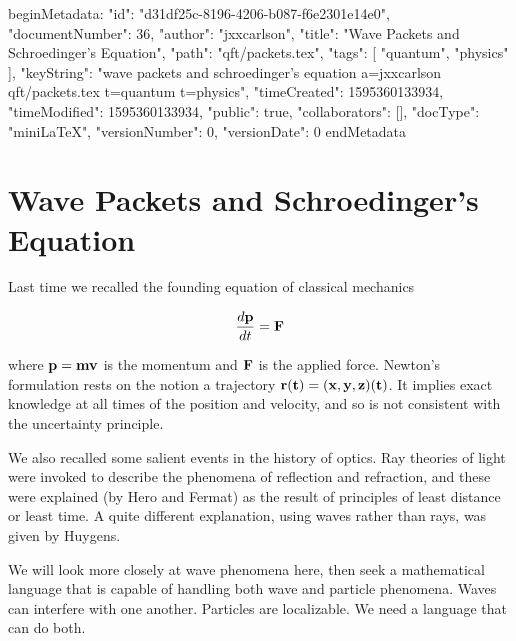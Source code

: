 beginMetadata:
{
    "id": "d31df25c-8196-4206-b087-f6e2301e14e0",
    "documentNumber": 36,
    "author": "jxxcarlson",
    "title": "Wave Packets and Schroedinger's Equation",
    "path": "qft/packets.tex",
    "tags": [
        "quantum",
        "physics"
    ],
    "keyString": "wave packets and schroedinger's equation a=jxxcarlson qft/packets.tex t=quantum t=physics",
    "timeCreated": 1595360133934,
    "timeModified": 1595360133934,
    "public": true,
    "collaborators": [],
    "docType": "miniLaTeX",
    "versionNumber": 0,
    "versionDate": 0
}
endMetadata

\begin{mathmacro}
\newcommand{\bop}[0]{\bf{p}}
\newcommand{\boF}[0]{\bf{F}}
\newcommand{\bor}[0]{\bf{r}}
\newcommand{\bov}[0]{\bf{v}}
\end{mathmacro}

\setcounter{section}{3}



\section{Wave Packets and Schroedinger's Equation}




Last time we recalled the founding equation of classical mechanics

\begin{equation}
\frac{d \bf{p} }{dt} = \boF
\end{equation}

where $\bop = m\bov $ is the momentum and $\boF $  is the applied force.  Newton's formulation rests on the notion a trajectory $\bor(t) = (x,y,z)(t)$.  It implies exact knowledge at all times of the position and velocity, and so is not consistent with the uncertainty principle.

We also recalled some salient events in the history of optics. Ray theories of light were invoked to describe the phenomena of reflection and refraction, and these were explained (by Hero and Fermat) as the result of principles of least distance or least time.  A quite different explanation, using waves rather than rays, was given by Huygens. 

We will look more closely at wave phenomena here, then seek a mathematical language that is capable of handling both wave and particle phenomena.  Waves can interfere with one another.  Particles are localizable. We need a language that can do both.

